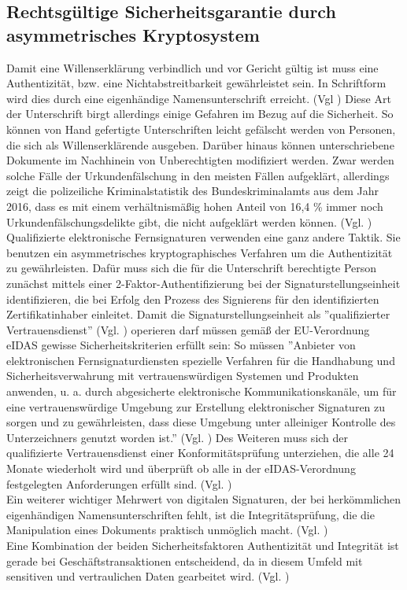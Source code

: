 \documentclass[deutsch]{lib/llncs/llncs}
\begin{document}
\subsection{Rechtsgültige Sicherheitsgarantie durch asymmetrisches Kryptosystem}
Damit eine Willenserklärung verbindlich und vor Gericht gültig ist muss eine Authentizität, bzw. eine Nichtabstreitbarkeit gewährleistet sein. In Schriftform wird dies durch eine eigenhändige Namensunterschrift erreicht. (Vgl \cite[S. 5-6]{Zitat07}) Diese Art der Unterschrift birgt allerdings einige Gefahren im Bezug auf die Sicherheit. So können von Hand gefertigte Unterschriften leicht gefälscht werden von Personen, die sich als Willenserklärende ausgeben. Darüber hinaus können unterschriebene Dokumente im Nachhinein von Unberechtigten modifiziert werden. Zwar werden solche Fälle der Urkundenfälschung in den meisten Fällen aufgeklärt, allerdings zeigt die polizeiliche Kriminalstatistik des Bundeskriminalamts aus dem Jahr 2016, dass es mit einem verhältnismäßig hohen Anteil von 16,4 \% immer noch Urkundenfälschungsdelikte gibt, die nicht aufgeklärt werden können. (Vgl. \cite[S. 34]{Zitat10})\\
Qualifizierte elektronische Fernsignaturen verwenden eine ganz andere Taktik. Sie benutzen ein asymmetrisches kryptographisches Verfahren um die Authentizität zu gewährleisten. Dafür muss sich die für die Unterschrift berechtigte Person zunächst mittels einer 2-Faktor-Authentifizierung bei der Signaturstellungseinheit identifizieren, die bei Erfolg den Prozess des Signierens für den identifizierten Zertifikatinhaber einleitet. Damit die Signaturstellungseinheit als ''qualifizierter Vertrauensdienst'' (Vgl. \cite[S. 30]{Zitat08}) operieren darf müssen gemäß der EU-Verordnung eIDAS gewisse Sicherheitskriterien erfüllt sein: So müssen ''Anbieter von elektronischen Fernsignaturdiensten spezielle Verfahren für die Handhabung und Sicherheitsverwahrung mit vertrauenswürdigen Systemen und Produkten anwenden, u. a. durch abgesicherte elektronische Kommunikationskanäle, um für eine vertrauenswürdige Umgebung zur Erstellung elektronischer Signaturen zu sorgen und zu gewährleisten, dass diese Umgebung unter alleiniger Kontrolle des Unterzeichners genutzt worden ist.'' (Vgl. \cite[S. 233]{Zitat09}) Des Weiteren muss sich der qualifizierte Vertrauensdienst einer Konformitätsprüfung unterziehen, die alle 24 Monate wiederholt wird und überprüft ob alle in der eIDAS-Verordnung festgelegten Anforderungen erfüllt sind. (Vgl. \cite[S. 30]{Zitat08}) \\
Ein weiterer wichtiger Mehrwert von digitalen Signaturen, der bei herkömmlichen eigenhändigen Namensunterschriften fehlt, ist die Integritätsprüfung, die die Manipulation eines Dokuments praktisch unmöglich macht. (Vgl. \cite[S. 7]{Zitat05}) \\
Eine Kombination der beiden Sicherheitsfaktoren Authentizität und Integrität ist gerade bei Geschäftstransaktionen entscheidend, da in diesem Umfeld mit sensitiven und vertraulichen Daten gearbeitet wird. (Vgl. \cite[S. 7]{Zitat05})
\end{document}
